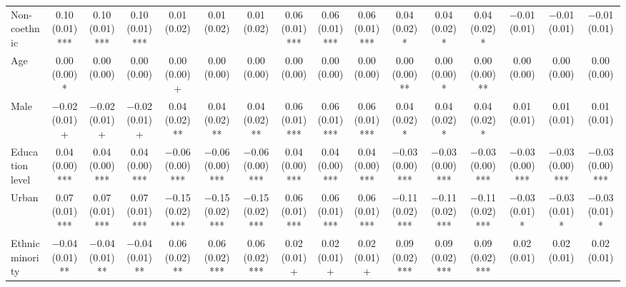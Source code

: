 \begin{table}[H]
\begin{tabular}[t]{lccccccccccccccc}
Non-coethnic & \num{0.10} (\num{0.01})*** & \num{0.10} (\num{0.01})*** & \num{0.10} (\num{0.01})*** & \num{0.01} (\num{0.02}) & \num{0.01} (\num{0.02}) & \num{0.01} (\num{0.02}) & \num{0.06} (\num{0.01})*** & \num{0.06} (\num{0.01})*** & \num{0.06} (\num{0.01})*** & \num{0.04} (\num{0.02})* & \num{0.04} (\num{0.02})* & \num{0.04} (\num{0.02})* & \num{-0.01} (\num{0.01}) & \num{-0.01} (\num{0.01}) & \num{-0.01} (\num{0.01})\\
Age & \num{0.00} (\num{0.00})* & \num{0.00} (\num{0.00}) & \num{0.00} (\num{0.00}) & \num{0.00} (\num{0.00})+ & \num{0.00} (\num{0.00}) & \num{0.00} (\num{0.00}) & \num{0.00} (\num{0.00}) & \num{0.00} (\num{0.00}) & \num{0.00} (\num{0.00}) & \num{0.00} (\num{0.00})** & \num{0.00} (\num{0.00})* & \num{0.00} (\num{0.00})** & \num{0.00} (\num{0.00}) & \num{0.00} (\num{0.00}) & \num{0.00} (\num{0.00})\\
Male & \num{-0.02} (\num{0.01})+ & \num{-0.02} (\num{0.01})+ & \num{-0.02} (\num{0.01})+ & \num{0.04} (\num{0.02})** & \num{0.04} (\num{0.02})** & \num{0.04} (\num{0.02})** & \num{0.06} (\num{0.01})*** & \num{0.06} (\num{0.01})*** & \num{0.06} (\num{0.01})*** & \num{0.04} (\num{0.02})* & \num{0.04} (\num{0.02})* & \num{0.04} (\num{0.02})* & \num{0.01} (\num{0.01}) & \num{0.01} (\num{0.01}) & \num{0.01} (\num{0.01})\\
Education level & \num{0.04} (\num{0.00})*** & \num{0.04} (\num{0.00})*** & \num{0.04} (\num{0.00})*** & \num{-0.06} (\num{0.00})*** & \num{-0.06} (\num{0.00})*** & \num{-0.06} (\num{0.00})*** & \num{0.04} (\num{0.00})*** & \num{0.04} (\num{0.00})*** & \num{0.04} (\num{0.00})*** & \num{-0.03} (\num{0.00})*** & \num{-0.03} (\num{0.00})*** & \num{-0.03} (\num{0.00})*** & \num{-0.03} (\num{0.00})*** & \num{-0.03} (\num{0.00})*** & \num{-0.03} (\num{0.00})***\\
Urban & \num{0.07} (\num{0.01})*** & \num{0.07} (\num{0.01})*** & \num{0.07} (\num{0.01})*** & \num{-0.15} (\num{0.02})*** & \num{-0.15} (\num{0.02})*** & \num{-0.15} (\num{0.02})*** & \num{0.06} (\num{0.01})*** & \num{0.06} (\num{0.01})*** & \num{0.06} (\num{0.01})*** & \num{-0.11} (\num{0.02})*** & \num{-0.11} (\num{0.02})*** & \num{-0.11} (\num{0.02})*** & \num{-0.03} (\num{0.01})* & \num{-0.03} (\num{0.01})* & \num{-0.03} (\num{0.01})*\\
Ethnic minority & \num{-0.04} (\num{0.01})** & \num{-0.04} (\num{0.01})** & \num{-0.04} (\num{0.01})** & \num{0.06} (\num{0.02})** & \num{0.06} (\num{0.02})*** & \num{0.06} (\num{0.02})*** & \num{0.02} (\num{0.01})+ & \num{0.02} (\num{0.01})+ & \num{0.02} (\num{0.01})+ & \num{0.09} (\num{0.02})*** & \num{0.09} (\num{0.02})*** & \num{0.09} (\num{0.02})*** & \num{0.02} (\num{0.01}) & \num{0.02} (\num{0.01}) & \num{0.02} (\num{0.01})\\

\end{tabular}
\end{table}
